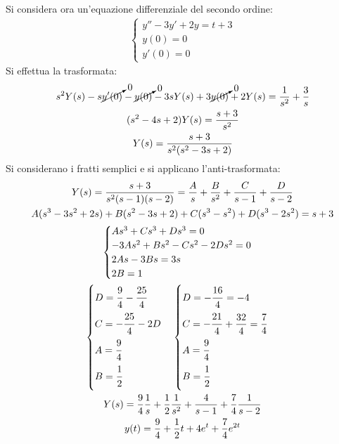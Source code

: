 \documentclass{article}
\numberwithin{equation}{subsection}
\begin{document}
Si considera ora un'equazione differenziale del secondo ordine:
\begin{gather*}
    \begin{cases}
        y''-3y'+2y=t+3\\
        y(0)=0\\
        y'(0)=0
    \end{cases}
\end{gather*}
Si effettua la trasformata:
\begin{gather*}
    s^2Y(s)-s\cancelto{0}{y'(0)}-\cancelto{0}{y(0)}-3sY(s)+3\cancelto{0}{y(0)}+2Y(s)=\frac{1}{s^2}+\frac{3}{s}\\
    (s^2-4s+2)Y(s)=\frac{s+3}{s^2}\\
    Y(s)=\frac{s+3}{s^2(s^2-3s+2)}
\end{gather*}
Si considerano i fratti semplici e si applicano l'anti-trasformata:
\begin{gather*}
    Y(s)=\frac{s+3}{s^2(s-1)(s-2)}=\frac{A}{s}+\frac{B}{s^2}+\frac{C}{s-1}+\frac{D}{s-2}\\
    A(s^3-3s^2+2s)+B(s^2-3s+2)+C(s^3-s^2)+D(s^3-2s^2)=s+3\\
    \begin{cases}
        As^3+Cs^3+Ds^3=0\\
        -3As^2+Bs^2-Cs^2-2Ds^2=0\\
        2As-3Bs=3s\\
        2B=1
    \end{cases}\\
    \begin{cases}
        D=\displaystyle\frac{\strut9}{\strut4}-\displaystyle\frac{\strut25}{\strut4}\\
        C=-\displaystyle\frac{\strut25}{\strut4}-2D\\
        A=\displaystyle\frac{\strut9}{\strut4}\\
        B=\displaystyle\frac{\strut1}{\strut2}
    \end{cases}
    \begin{cases}
        D=-\displaystyle\frac{\strut16}{\strut4}=-4\\
        C=-\displaystyle\frac{\strut21}{\strut4}+\frac{32}{\strut4}=\frac{7}{4}\\
        A=\displaystyle\frac{\strut9}{\strut4}\\
        B=\displaystyle\frac{\strut1}{\strut2}
    \end{cases}\\
    Y(s)=\frac{9}{4}\frac{1}{s}+\frac{1}{2}\frac{1}{s^2}+\frac{4}{s-1}+\frac{7}{4}\frac{1}{s-2}\\
    y(t)=\frac{9}{4}+\frac{1}{2}t+4e^t+\frac{7}{4}e^{2t}
\end{gather*}
\end{document}
